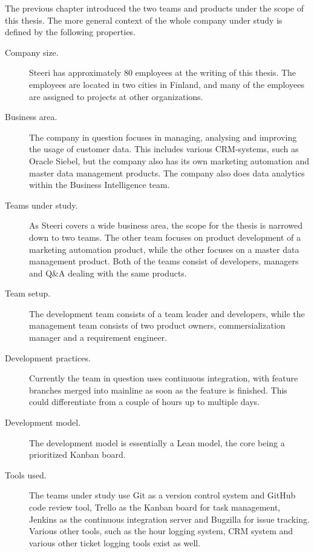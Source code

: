 \documentclass[english, grading]{tktltiki2}
\theoremstyle{definition}
\theoremstyle{remark}
\begin{document}
The previous chapter introduced the two teams and products under the scope of this thesis. The more general context of the whole company under study is defined by the following properties. 

\begin{description}
  \item[Company size.] Steeri has approximately 80 employees at the writing of this thesis. The employees are located in two cities in Finland, and many of the employees are assigned to projects at other organizations.
  \item[Business area.] The company in question focuses in managing, analysing and improving the usage of customer data. This includes various CRM-systems, such as Oracle Siebel, but the company also has its own marketing automation and master data management products. The company also does data analytics within the Business Intelligence team.
  \item[Teams under study.] As Steeri covers a wide business area, the scope for the thesis is narrowed down to two teams. The other team focuses on product development of a marketing automation product, while the other focuses on a master data management product. Both of the teams consist of developers, managers and Q\&A dealing with the same products.
  \item[Team setup.] The development team consists of a team leader and developers, while the management team consists of two product owners, commersialization manager and a requirement engineer. 
  \item[Development practices.] Currently the team in question uses continuous integration, with feature branches merged into mainline as soon as the feature is finished. This could differentiate from a couple of hours up to multiple days.
  \item[Development model.] The development model is essentially a Lean model, the core being a prioritized Kanban board.  
  \item[Tools used.] The teams under study use Git as a version control system and GitHub code review tool, Trello as the Kanban board for task management, Jenkins as the continuous integration server and Bugzilla for issue tracking. Various other tools, such as the hour logging system, CRM system and various other ticket logging tools exist as well.  
\end{description}
\end{document}

